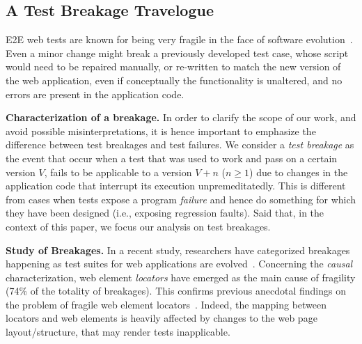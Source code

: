 \subsection{A Test Breakage Travelogue}\label{sec:breakage-travelogue}

E2E web tests are known for being very fragile in the face of software evolution~\cite{2016-leotta-Advances,2016-Leotta-JSEP,Hammoudi-2016-ICST}. %
Even a minor change might break a previously developed test case, whose script would need to be repaired manually, or re-written to match the new version of the web application, even if conceptually the functionality is unaltered, and no errors are present in the application code.

\noindent
\textbf{Characterization of a breakage.}
In order to clarify the scope of our work, and avoid possible misinterpretations, it is hence important to emphasize the difference between test breakages and test failures. We consider a \textit{test breakage} as the event that occur when a test that was used to work and pass on a certain version $V$, fails to be applicable to a version $V+n$ ($n \geq 1$) due to changes in the application code that interrupt its execution unpremeditatedly. %
This is different from cases when tests expose a program \textit{failure} and hence do something for which they have been designed (i.e., exposing regression faults).
Said that, in the context of this paper, we focus our analysis on test breakages.

\noindent
\textbf{Study of Breakages.}
In a recent study, researchers have categorized breakages happening as test suites for web applications are evolved~\cite{Hammoudi-2016-ICST}. 
%
Concerning the \textit{causal} characterization, web element \textit{locators} have emerged as the main cause of fragility (74\% of the totality of breakages). %
%
This confirms previous anecdotal findings on the problem of fragile web element locators~\cite{2016-Leotta-JSEP,2014-leotta-WoSAR,Daniel:2011:AGR:2002931.2002937,2013-Ricca-wse}.
%
Indeed, the mapping between locators and web elements is heavily affected by changes to the web page layout/structure, that may render tests inapplicable. %

